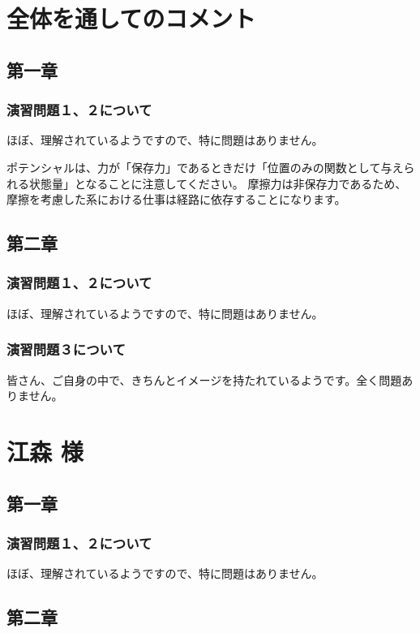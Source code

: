 \documentclass[uplatex,dvipdfmx,a4paper,11pt]{jsreport}
\begin{document}
\section*{全体を通してのコメント}
\subsection*{第一章}
\subsubsection*{演習問題１、２について}
ほぼ、理解されているようですので、特に問題はありません。

ポテンシャルは、力が「保存力」であるときだけ「位置のみの関数として与えられる状態量」となることに注意してください。
摩擦力は非保存力であるため、摩擦を考慮した系における仕事は経路に依存することになります。

\subsection*{第二章}
\subsubsection*{演習問題１、２について}
ほぼ、理解されているようですので、特に問題はありません。

\subsubsection*{演習問題３について}
皆さん、ご自身の中で、きちんとイメージを持たれているようです。全く問題ありません。


\clearpage

\section*{江森 様}
\subsection*{第一章}
\subsubsection*{演習問題１、２について}
ほぼ、理解されているようですので、特に問題はありません。

\subsection*{第二章}
\end{document}
